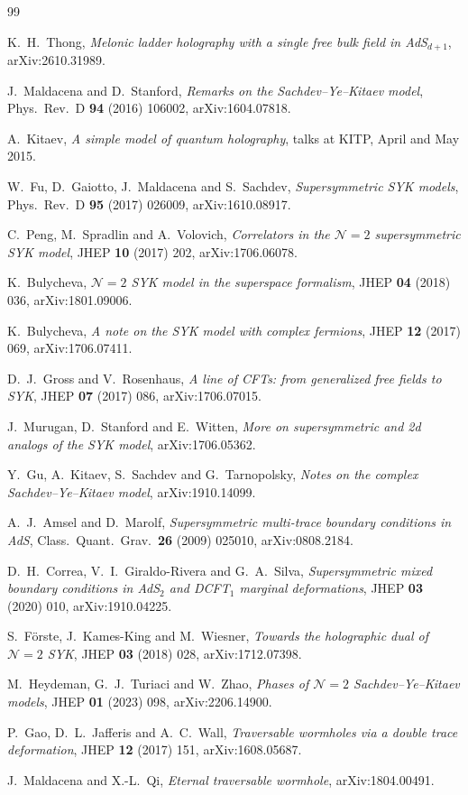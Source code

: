 \begin{thebibliography}{99}
\small

K.~H.~Thong, \emph{Melonic ladder holography with a single free bulk field in AdS$_{d+1}$}, arXiv:2610.31989.

J.~Maldacena and D.~Stanford, \emph{Remarks on the Sachdev--Ye--Kitaev model}, Phys.\ Rev.\ D \textbf{94} (2016) 106002, arXiv:1604.07818.

A.~Kitaev, \emph{A simple model of quantum holography}, talks at KITP, April and May 2015.

W.~Fu, D.~Gaiotto, J.~Maldacena and S.~Sachdev, \emph{Supersymmetric SYK models}, Phys.\ Rev.\ D \textbf{95} (2017) 026009, arXiv:1610.08917.

C.~Peng, M.~Spradlin and A.~Volovich, \emph{Correlators in the $\mathcal N=2$ supersymmetric SYK model}, JHEP \textbf{10} (2017) 202, arXiv:1706.06078.

K.~Bulycheva, \emph{$\mathcal N=2$ SYK model in the superspace formalism}, JHEP \textbf{04} (2018) 036, arXiv:1801.09006.

K.~Bulycheva, \emph{A note on the SYK model with complex fermions}, JHEP \textbf{12} (2017) 069, arXiv:1706.07411.

D.~J.~Gross and V.~Rosenhaus, \emph{A line of CFTs: from generalized free fields to SYK}, JHEP \textbf{07} (2017) 086, arXiv:1706.07015.

J.~Murugan, D.~Stanford and E.~Witten, \emph{More on supersymmetric and 2d analogs of the SYK model}, arXiv:1706.05362.

Y.~Gu, A.~Kitaev, S.~Sachdev and G.~Tarnopolsky, \emph{Notes on the complex Sachdev--Ye--Kitaev model}, arXiv:1910.14099.

A.~J.~Amsel and D.~Marolf, \emph{Supersymmetric multi-trace boundary conditions in AdS}, Class.\ Quant.\ Grav.\ \textbf{26} (2009) 025010, arXiv:0808.2184.

D.~H.~Correa, V.~I.~Giraldo-Rivera and G.~A.~Silva, \emph{Supersymmetric mixed boundary conditions in AdS$_2$ and DCFT$_1$ marginal deformations}, JHEP \textbf{03} (2020) 010, arXiv:1910.04225.

S.~F\"orste, J.~Kames-King and M.~Wiesner, \emph{Towards the holographic dual of $\mathcal N=2$ SYK}, JHEP \textbf{03} (2018) 028, arXiv:1712.07398.

M.~Heydeman, G.~J.~Turiaci and W.~Zhao, \emph{Phases of $\mathcal N=2$ Sachdev--Ye--Kitaev models}, JHEP \textbf{01} (2023) 098, arXiv:2206.14900.

P.~Gao, D.~L.~Jafferis and A.~C.~Wall, \emph{Traversable wormholes via a double trace deformation}, JHEP \textbf{12} (2017) 151, arXiv:1608.05687.

J.~Maldacena and X.-L.~Qi, \emph{Eternal traversable wormhole}, arXiv:1804.00491.

\end{thebibliography}
